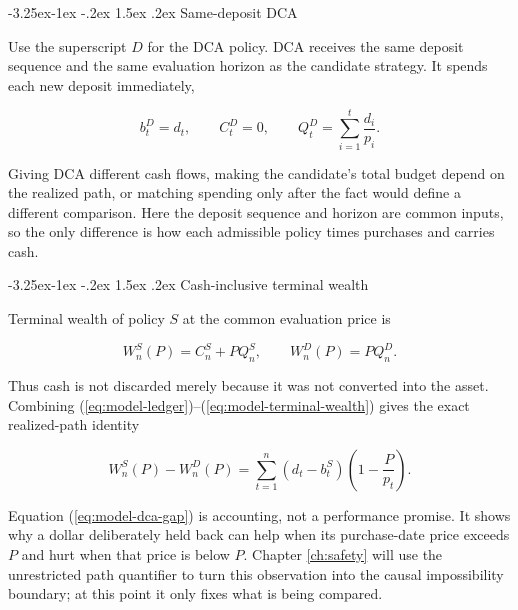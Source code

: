 \documentclass[12pt,a4paper,oneside]{report}
\makeatletter
\renewcommand\subsection{\@startsection{subsection}{2}{\z@}%
  {-3.25ex\@plus -1ex \@minus -.2ex}%
  {1.5ex \@plus .2ex}%
  {\normalfont\fontsize{12}{15}\selectfont\bfseries}}
\makeatother
\begin{document}
\subsection{Same-deposit DCA}
\label{sec:comparators}

Use the superscript $D$ for the DCA policy. DCA receives the same deposit
sequence and the same evaluation horizon as the candidate strategy. It spends
each new deposit immediately,

\begin{equation}
  b_t^D=d_t,\qquad C_t^D=0,\qquad
  Q_t^D=\sum_{i=1}^{t}\frac{d_i}{p_i}.
  \label{eq:model-dca}
\end{equation}

Giving DCA different cash flows, making the candidate's total budget depend on
the realized path, or matching spending only after the fact would define a
different comparison. Here the deposit sequence and horizon are common inputs,
so the only difference is how each admissible policy times purchases and
carries cash.

\subsection{Cash-inclusive terminal wealth}
\label{sec:terminal-wealth}

Terminal wealth of policy $S$ at the common evaluation price is

\begin{equation}
  W_n^S(P)=C_n^S+P Q_n^S,
  \qquad
  W_n^D(P)=P Q_n^D.
  \label{eq:model-terminal-wealth}
\end{equation}

Thus cash is not discarded merely because it was not converted into the
asset. Combining (\ref{eq:model-ledger})--(\ref{eq:model-terminal-wealth})
gives the exact realized-path identity

\begin{equation}
  W_n^S(P)-W_n^D(P)
  =\sum_{t=1}^{n}(d_t-b_t^S)
    \left(1-\frac{P}{p_t}\right).
  \label{eq:model-dca-gap}
\end{equation}

Equation (\ref{eq:model-dca-gap}) is accounting, not a performance promise.
It shows why a dollar deliberately held back can help when its purchase-date
price exceeds $P$ and hurt when that price is below $P$. Chapter
\ref{ch:safety} will use the unrestricted path quantifier to turn this
observation into the causal impossibility boundary; at this point it only fixes
what is being compared.
\end{document}
